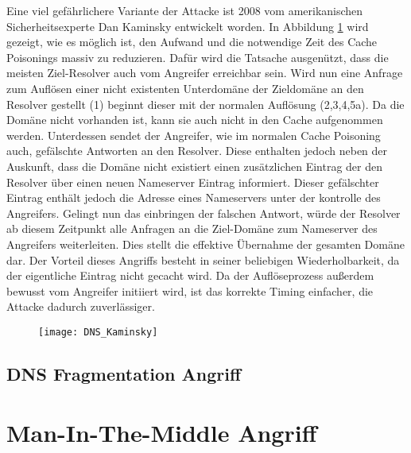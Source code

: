 Eine viel gefährlichere Variante der Attacke ist 2008 vom amerikanischen Sicherheitsexperte Dan Kaminsky entwickelt worden\cite{Son2010}. In Abbildung \ref{img:dnskaminsky} wird gezeigt, wie es möglich ist, den Aufwand und die notwendige Zeit des Cache Poisonings massiv zu reduzieren. Dafür wird die Tatsache ausgenützt, dass die meisten Ziel-Resolver auch vom Angreifer erreichbar sein. Wird nun eine Anfrage zum Auflösen einer nicht existenten Unterdomäne der Zieldomäne an den Resolver gestellt (1) beginnt dieser mit der normalen Auflösung (2,3,4,5a). Da die Domäne nicht vorhanden ist, kann sie auch nicht in den Cache aufgenommen werden. Unterdessen sendet der Angreifer, wie im normalen Cache Poisoning auch, gefälschte Antworten an den Resolver. Diese enthalten jedoch neben der Auskunft, dass die Domäne nicht existiert einen zusätzlichen Eintrag der den Resolver über einen neuen Nameserver Eintrag informiert. Dieser gefälschter Eintrag enthält jedoch die Adresse eines Nameservers unter der kontrolle des Angreifers. Gelingt nun das einbringen der falschen Antwort, würde der Resolver ab diesem Zeitpunkt alle Anfragen an die Ziel-Domäne zum Nameserver des Angreifers weiterleiten. Dies stellt die effektive Übernahme der gesamten Domäne dar.
Der Vorteil dieses Angriffs besteht in seiner beliebigen Wiederholbarkeit, da der eigentliche Eintrag nicht gecacht wird. Da der Auflöseprozess außerdem bewusst vom Angreifer initiiert wird, ist das korrekte Timing einfacher, die Attacke dadurch zuverlässiger.

\begin{figure}[htbp]
    \centering
    \texttt{[image: DNS\_Kaminsky]}
    \caption{}
    \label{img:dnskaminsky}
\end{figure}

\subsection{DNS Fragmentation Angriff}


\section{Man-In-The-Middle Angriff}

